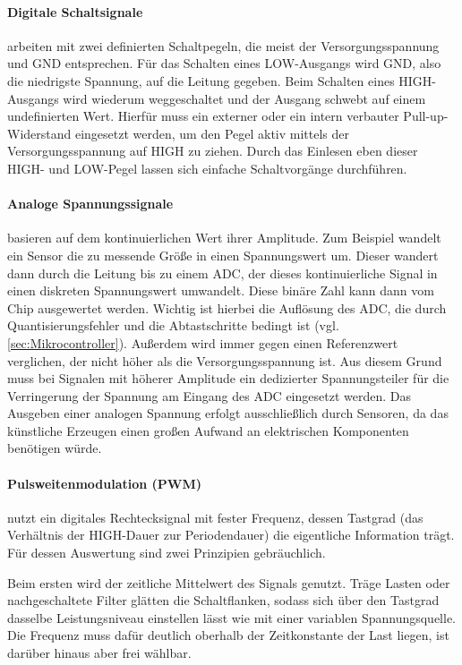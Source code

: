 \paragraph{Digitale Schaltsignale}
arbeiten mit zwei definierten Schaltpegeln, die meist der Versorgungsspannung und GND entsprechen. Für das Schalten eines LOW-Ausgangs
wird GND, also die niedrigste Spannung, auf die Leitung gegeben. Beim Schalten eines HIGH-Ausgangs wird wiederum
weggeschaltet und der Ausgang schwebt auf einem undefinierten Wert. Hierfür muss ein externer oder ein intern verbauter Pull-up-Widerstand
eingesetzt werden, um den Pegel aktiv mittels der Versorgungsspannung auf HIGH zu ziehen. Durch das Einlesen eben dieser
HIGH- und LOW-Pegel lassen sich einfache Schaltvorgänge durchführen.

\paragraph{Analoge Spannungssignale}
basieren auf dem kontinuierlichen Wert ihrer Amplitude. Zum Beispiel wandelt ein Sensor die zu messende Größe in einen Spannungswert
um. Dieser wandert dann durch die Leitung bis zu einem ADC, der dieses kontinuierliche Signal in einen diskreten Spannungswert umwandelt.
Diese binäre Zahl kann dann vom Chip ausgewertet werden. Wichtig ist hierbei die Auflösung des ADC, die durch Quantisierungsfehler
und die Abtastschritte bedingt ist (vgl. \cref{sec:Mikrocontroller}). Außerdem wird immer gegen einen Referenzwert verglichen, der nicht höher als die Versorgungsspannung
ist. Aus diesem Grund muss bei Signalen mit höherer Amplitude ein dedizierter Spannungsteiler für die Verringerung der Spannung
am Eingang des ADC eingesetzt werden. Das Ausgeben einer analogen Spannung erfolgt ausschließlich durch Sensoren, da das künstliche
Erzeugen einen großen Aufwand an elektrischen Komponenten benötigen würde.

\paragraph{Pulsweitenmodulation (PWM)}
nutzt ein digitales Rechtecksignal mit fester Frequenz, dessen Tastgrad (das
Verhältnis der HIGH-Dauer zur Periodendauer) die eigentliche Information trägt.
Für dessen Auswertung sind zwei Prinzipien gebräuchlich.

Beim ersten wird der zeitliche Mittelwert des Signals genutzt. Träge Lasten oder
nachgeschaltete Filter glätten die Schaltflanken, sodass sich über den Tastgrad
dasselbe Leistungsniveau einstellen lässt wie mit einer variablen Spannungsquelle.
Die Frequenz muss dafür deutlich oberhalb der Zeitkonstante der Last liegen, ist
darüber hinaus aber frei wählbar.

